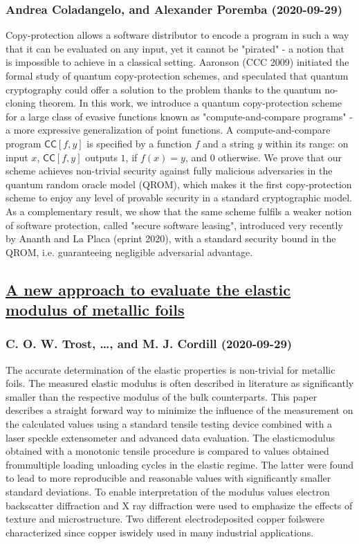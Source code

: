 \subsubsection*{Andrea Coladangelo, and Alexander Poremba (2020-09-29)}
Copy-protection allows a software distributor to encode a program in such a
way that it can be evaluated on any input, yet it cannot be "pirated" - a
notion that is impossible to achieve in a classical setting. Aaronson (CCC
2009) initiated the formal study of quantum copy-protection schemes, and
speculated that quantum cryptography could offer a solution to the problem
thanks to the quantum no-cloning theorem. In this work, we introduce a quantum
copy-protection scheme for a large class of evasive functions known as
"compute-and-compare programs" - a more expressive generalization of point
functions. A compute-and-compare program $\mathsf{CC}[f,y]$ is specified by a
function $f$ and a string $y$ within its range: on input $x$,
$\mathsf{CC}[f,y]$ outputs $1$, if $f(x) = y$, and $0$ otherwise. We prove that
our scheme achieves non-trivial security against fully malicious adversaries in
the quantum random oracle model (QROM), which makes it the first
copy-protection scheme to enjoy any level of provable security in a standard
cryptographic model. As a complementary result, we show that the same scheme
fulfils a weaker notion of software protection, called "secure software
leasing", introduced very recently by Ananth and La Placa (eprint 2020), with a
standard security bound in the QROM, i.e. guaranteeing negligible adversarial
advantage.

\subsection*{\href{http://arxiv.org/abs/2009.13850v1}{A new approach to evaluate the elastic modulus of metallic foils}}
\subsubsection*{C. O. W. Trost, \dots, and M. J. Cordill (2020-09-29)}
The accurate determination of the elastic properties is non-trivial for
metallic foils. The measured elastic modulus is often described in literature
as significantly smaller than the respective modulus of the bulk counterparts.
This paper describes a straight forward way to minimize the influence of the
measurement on the calculated values using a standard tensile testing device
combined with a laser speckle extensometer and advanced data evaluation. The
elasticmodulus obtained with a monotonic tensile procedure is compared to
values obtained frommultiple loading unloading cycles in the elastic regime.
The latter were found to lead to more reproducible and reasonable values with
significantly smaller standard deviations. To enable interpretation of the
modulus values electron backscatter diffraction and X ray diffraction were used
to emphasize the effects of texture and microstructure. Two different
electrodeposited copper foilswere characterized since copper iswidely used in
many industrial applications.

